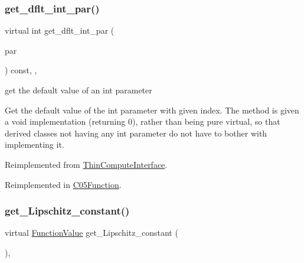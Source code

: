 \subsubsection{\texorpdfstring{get\+\_\+dflt\+\_\+int\+\_\+par()}{get\_dflt\_int\_par()}}
{\footnotesize\ttfamily virtual int get\+\_\+dflt\+\_\+int\+\_\+par (\begin{DoxyParamCaption}\item[{const \mbox{\hyperlink{class_s_m_spp__di__unipi__it_1_1_thin_compute_interface_aa3d710629ad8c434286726ad810c3b47}{idx\+\_\+type}}}]{par }\end{DoxyParamCaption}) const\hspace{0.3cm}{\ttfamily [inline]}, {\ttfamily [override]}, {\ttfamily [virtual]}}



get the default value of an int parameter 

Get the default value of the int parameter with given index. The method is given a void implementation (returning 0), rather than being pure virtual, so that derived classes not having any int parameter do not have to bother with implementing it. 

Reimplemented from \mbox{\hyperlink{class_s_m_spp__di__unipi__it_1_1_thin_compute_interface_aee367363e42f86be5376165878f958f5}{Thin\+Compute\+Interface}}.



Reimplemented in \mbox{\hyperlink{class_s_m_spp__di__unipi__it_1_1_c05_function_a75dd1491b74c4b9476755e061dce3e04}{C05\+Function}}.

\mbox{\label{class_s_m_spp__di__unipi__it_1_1_function_a472422601268368c33568731d4bb0f19}} 
\subsubsection{\texorpdfstring{get\+\_\+\+Lipschitz\+\_\+constant()}{get\_Lipschitz\_constant()}}
{\footnotesize\ttfamily virtual \mbox{\hyperlink{class_s_m_spp__di__unipi__it_1_1_function_a9ad432406b609e28d340f73e9474bffe}{Function\+Value}} get\+\_\+\+Lipschitz\+\_\+constant (\begin{DoxyParamCaption}\item[{void}]{ }\end{DoxyParamCaption})\hspace{0.3cm}{\ttfamily [inline]}, {\ttfamily [virtual]}}



